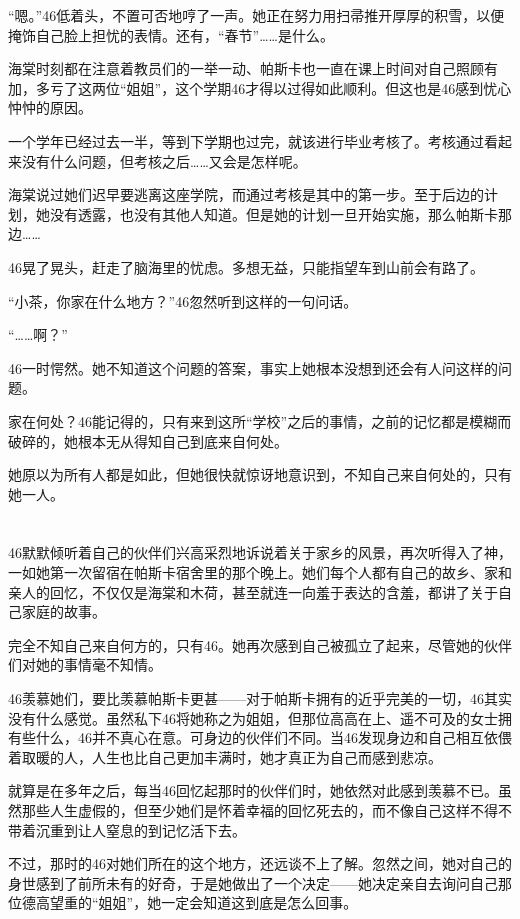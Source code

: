 “嗯。”46低着头，不置可否地哼了一声。她正在努力用扫帚推开厚厚的积雪，以便掩饰自己脸上担忧的表情。还有，“春节”……是什么。

海棠时刻都在注意着教员们的一举一动、帕斯卡也一直在课上时间对自己照顾有加，多亏了这两位“姐姐”，这个学期46才得以过得如此顺利。但这也是46感到忧心忡忡的原因。

一个学年已经过去一半，等到下学期也过完，就该进行毕业考核了。考核通过看起来没有什么问题，但考核之后……又会是怎样呢。

海棠说过她们迟早要逃离这座学院，而通过考核是其中的第一步。至于后边的计划，她没有透露，也没有其他人知道。但是她的计划一旦开始实施，那么帕斯卡那边……

46晃了晃头，赶走了脑海里的忧虑。多想无益，只能指望车到山前会有路了。

“小茶，你家在什么地方？”46忽然听到这样的一句问话。

“……啊？”

46一时愕然。她不知道这个问题的答案，事实上她根本没想到还会有人问这样的问题。

家在何处？46能记得的，只有来到这所“学校”之后的事情，之前的记忆都是模糊而破碎的，她根本无从得知自己到底来自何处。

她原以为所有人都是如此，但她很快就惊讶地意识到，不知自己来自何处的，只有她一人。

\section*{}

46默默倾听着自己的伙伴们兴高采烈地诉说着关于家乡的风景，再次听得入了神，一如她第一次留宿在帕斯卡宿舍里的那个晚上。她们每个人都有自己的故乡、家和亲人的回忆，不仅仅是海棠和木荷，甚至就连一向羞于表达的含羞，都讲了关于自己家庭的故事。

完全不知自己来自何方的，只有46。她再次感到自己被孤立了起来，尽管她的伙伴们对她的事情毫不知情。 

46羡慕她们，要比羡慕帕斯卡更甚——对于帕斯卡拥有的近乎完美的一切，46其实没有什么感觉。虽然私下46将她称之为姐姐，但那位高高在上、遥不可及的女士拥有些什么，46并不真心在意。可身边的伙伴们不同。当46发现身边和自己相互依偎着取暖的人，人生也比自己更加丰满时，她才真正为自己而感到悲凉。

就算是在多年之后，每当46回忆起那时的伙伴们时，她依然对此感到羡慕不已。虽然那些人生虚假的，但至少她们是怀着幸福的回忆死去的，而不像自己这样不得不带着沉重到让人窒息的到记忆活下去。

不过，那时的46对她们所在的这个地方，还远谈不上了解。忽然之间，她对自己的身世感到了前所未有的好奇，于是她做出了一个决定——她决定亲自去询问自己那位德高望重的“姐姐”，她一定会知道这到底是怎么回事。

